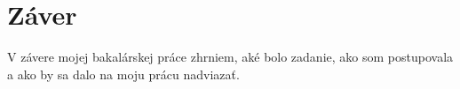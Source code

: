 \chapter*{Záver}  %

V závere mojej bakalárskej práce zhrniem, aké bolo zadanie, ako som postupovala a ako by sa dalo na moju prácu nadviazať.
